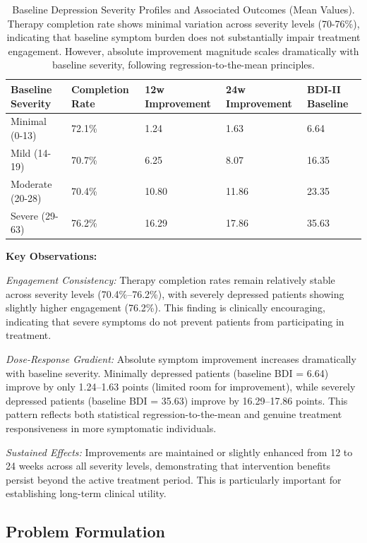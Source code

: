 \documentclass[conference]{IEEEtran}
\begin{document}
\begin{table}[h]
\centering
\caption{Baseline Depression Severity Profiles and Associated Outcomes (Mean Values). Therapy completion rate shows minimal variation across severity levels (70-76\%), indicating that baseline symptom burden does not substantially impair treatment engagement. However, absolute improvement magnitude scales dramatically with baseline severity, following regression-to-the-mean principles.}
\label{tab:severity_metrics_mean}
\begin{tabularx}{\linewidth}{|X|X|X|X|X|}
\hline
\textbf{Baseline Severity} & \textbf{Completion Rate} & \textbf{12w Improvement} & \textbf{24w Improvement} & \textbf{BDI-II Baseline} \\
\hline
Minimal (0-13) & 72.1\% & 1.24 & 1.63 & 6.64 \\ 
Mild (14-19) & 70.7\% & 6.25 & 8.07 & 16.35 \\ 
Moderate (20-28) & 70.4\% & 10.80 & 11.86 & 23.35 \\ 
Severe (29-63) & 76.2\% & 16.29 & 17.86 & 35.63 \\
\hline
\end{tabularx}
\end{table}

\textbf{Key Observations:}

\textit{Engagement Consistency:} Therapy completion rates remain relatively stable across severity levels (70.4\%–76.2\%), with severely depressed patients showing slightly higher engagement (76.2\%). This finding is clinically encouraging, indicating that severe symptoms do not prevent patients from participating in treatment.

\textit{Dose-Response Gradient:} Absolute symptom improvement increases dramatically with baseline severity. Minimally depressed patients (baseline BDI = 6.64) improve by only 1.24–1.63 points (limited room for improvement), while severely depressed patients (baseline BDI = 35.63) improve by 16.29–17.86 points. This pattern reflects both statistical regression-to-the-mean and genuine treatment responsiveness in more symptomatic individuals.

\textit{Sustained Effects:} Improvements are maintained or slightly enhanced from 12 to 24 weeks across all severity levels, demonstrating that intervention benefits persist beyond the active treatment period. This is particularly important for establishing long-term clinical utility.

\subsection{Problem Formulation}
\end{document}
